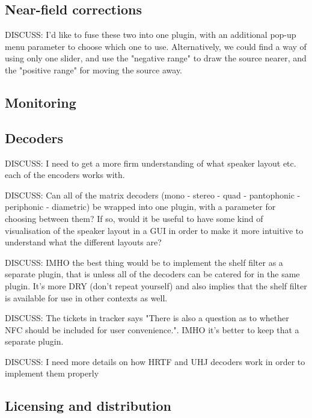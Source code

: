 \documentclass{article}
\begin{document}
\subsection{Near-field corrections}

DISCUSS: I'd like to fuse these two into one plugin, with an additional pop-up menu parameter to choose which one to use. Alternatively, we could find a way of using only one slider, and use the "negative range" to draw the source nearer, and the "positive range" for moving the source away.




\subsection{Monitoring}




\subsection{Decoders}

DISCUSS: I need to get a more firm understanding of what speaker layout etc. each of the encoders works with.

DISCUSS: Can all of the matrix decoders (mono - stereo - quad - pantophonic - periphonic - diametric) be wrapped into one plugin, with a parameter for choosing between them? If so, would it be useful to have some kind of visualisation of the speaker layout in a GUI in order to make it more intuitive to understand what the different layouts are?

DISCUSS: IMHO the best thing would be to implement the shelf filter as a separate plugin, that is unless all of the decoders can be catered for in the same plugin. It's more DRY (don't repeat yourself) and also implies that the shelf filter is available for use in other contexts as well.

DISCUSS: The tickets in tracker says "There is also a question as to whether NFC should be included for user convenience.". IMHO it's better to keep that a separate plugin.

DISCUSS: I need more details on how HRTF and UHJ decoders work in order to implement them properly




\subsection{Licensing and distribution}
\end{document}
